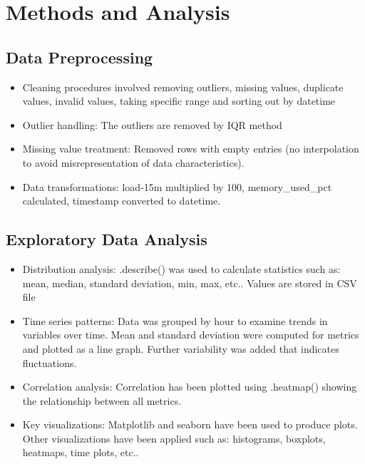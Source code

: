 \documentclass[11pt]{article}
\begin{document}
	\section{Methods and Analysis}
	
	\subsection{Data Preprocessing}
	\begin{itemize}
		\item Cleaning procedures involved removing outliers, missing values, duplicate values, invalid values, taking specific range and sorting out by datetime
		\item Outlier handling: The outliers are removed by IQR method
		\item Missing value treatment: Removed rows with empty entries (no interpolation to avoid misrepresentation of data characteristics).
		\item Data transformations: load-15m multiplied by 100, memory\_used\_pct calculated, timestamp converted to datetime.
	\end{itemize}
	
	\subsection{Exploratory Data Analysis}
	\begin{itemize}
		\item Distribution analysis: .describe() was used to calculate statistics such as: mean, median, standard deviation, min, max, etc.. Values are stored in CSV file
		\item Time series patterns: Data was grouped by hour to examine trends in variables over time. Mean and standard deviation were computed for metrics and plotted as a line graph. Further variability was added that indicates fluctuations.
		\item Correlation analysis: Correlation has been plotted using .heatmap() showing the relationship between all metrics.
		\item Key visualizations: Matplotlib and seaborn have been used to produce plots. Other visualizations have been applied such as: histograms, boxplots, heatmaps, time plots, etc..
	\end{itemize}
	
\end{document}
